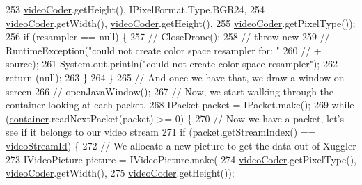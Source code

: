 \begin{DoxyCode}
253                     \hyperlink{classworkspace_1_1_a_r_drone_capture_image_1_1src_1_1_drone_tools_ade856f1d7f4cc80de7a3f76b847c5c40}{videoCoder}.getHeight(), IPixelFormat.Type.BGR24,
254                     \hyperlink{classworkspace_1_1_a_r_drone_capture_image_1_1src_1_1_drone_tools_ade856f1d7f4cc80de7a3f76b847c5c40}{videoCoder}.getWidth(), \hyperlink{classworkspace_1_1_a_r_drone_capture_image_1_1src_1_1_drone_tools_ade856f1d7f4cc80de7a3f76b847c5c40}{videoCoder}.getHeight(),
255                     \hyperlink{classworkspace_1_1_a_r_drone_capture_image_1_1src_1_1_drone_tools_ade856f1d7f4cc80de7a3f76b847c5c40}{videoCoder}.getPixelType());
256             \textcolor{keywordflow}{if} (resampler == null) \{
257                 \textcolor{comment}{// CloseDrone();}
258                 \textcolor{comment}{// throw new}
259                 \textcolor{comment}{// RuntimeException("could not create color space resampler for: "}
260                 \textcolor{comment}{// + source);}
261                 System.out.println(\textcolor{stringliteral}{"could not create color space resampler"});
262                 \textcolor{keywordflow}{return} (null);
263             \}
264         \}
265         \textcolor{comment}{// And once we have that, we draw a window on screen}
266         \textcolor{comment}{// openJavaWindow();}
267         \textcolor{comment}{// Now, we start walking through the container looking at each packet.}
268         IPacket packet = IPacket.make();
269         \textcolor{keywordflow}{while} (\hyperlink{classworkspace_1_1_a_r_drone_capture_image_1_1src_1_1_drone_tools_a1c1b1c9966fa3b80bb679d60c9b93c4d}{container}.readNextPacket(packet) >= 0) \{
270             \textcolor{comment}{// Now we have a packet, let's see if it belongs to our video stream}
271             \textcolor{keywordflow}{if} (packet.getStreamIndex() == \hyperlink{classworkspace_1_1_a_r_drone_capture_image_1_1src_1_1_drone_tools_a26096ea27f8535f3e07d0fd78c73933f}{videoStreamId}) \{
272                 \textcolor{comment}{// We allocate a new picture to get the data out of Xuggler}
273                 IVideoPicture picture = IVideoPicture.make(
274                         \hyperlink{classworkspace_1_1_a_r_drone_capture_image_1_1src_1_1_drone_tools_ade856f1d7f4cc80de7a3f76b847c5c40}{videoCoder}.getPixelType(), \hyperlink{classworkspace_1_1_a_r_drone_capture_image_1_1src_1_1_drone_tools_ade856f1d7f4cc80de7a3f76b847c5c40}{videoCoder}.getWidth(),
275                         \hyperlink{classworkspace_1_1_a_r_drone_capture_image_1_1src_1_1_drone_tools_ade856f1d7f4cc80de7a3f76b847c5c40}{videoCoder}.getHeight());

\end{DoxyCode}
